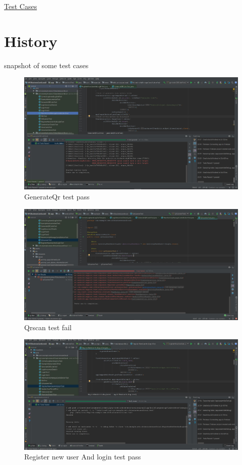 \documentclass[english]{article}
\begin{document}
					\href{https://github.com/XoloKDandashe/Alpha-Tech/tree/master/Code/NFCBusinessCardLocal2/app/src/androidTest/java/com/example/www/nfcbusinesscardlocal}{Test Cases}
	\section{History}
	snapshot of some test cases
\begin{figure}[h!]
				\centering
			\includegraphics[scale=0.7]{Capture.jpg}
				\caption{GenerateQr test pass}
				\label{figure: 1}
			\end{figure}
\begin{figure}
				\centering
			\includegraphics[scale=0.7]{QrscanFail.jpg}
				\caption{Qrscan test fail}
				\label{figure: 1}
			\end{figure}
\begin{figure}
				\centering
			\includegraphics[scale=0.7]{RegisterTest.jpg}
				\caption{Register new user And login test pass}
				\label{figure: 1}
			\end{figure}


	
	
		
\end{document}
